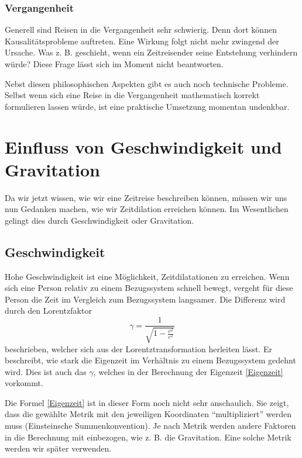 \begin{refsection}
\subsubsection{Vergangenheit}
Generell sind Reisen in die Vergangenheit sehr schwierig. Denn dort können Kausalitätsprobleme auftreten. Eine Wirkung folgt nicht mehr zwingend der Ursache. Was z. B. geschieht, wenn ein Zeitreisender seine Entstehung verhindern würde? Diese Frage lässt sich im Moment nicht beantworten. 

Nebst diesen philosophischen Aspekten gibt es auch noch technische Probleme. Selbst wenn sich eine Reise in die Vergangenheit mathematisch korrekt formulieren lassen würde, ist eine praktische Umsetzung momentan undenkbar.

\section{Einfluss von Geschwindigkeit und Gravitation}
Da wir jetzt wissen, wie wir eine Zeitreise beschreiben können, müssen wir uns nun Gedanken machen, wie wir Zeitdilation erreichen können. Im Wesentlichen gelingt dies durch Geschwindigkeit oder Gravitation. 
\subsection{Geschwindigkeit}
Hohe Geschwindigkeit ist eine Möglichkeit, Zeitdilatationen zu erreichen. Wenn sich eine Person relativ zu einem Bezugssystem schnell bewegt, vergeht für diese Person die Zeit im Vergleich zum Bezugssystem langsamer. Die Differenz wird durch den Lorentzfaktor 
%
%
%
\begin{equation} \label{lorentzfaktor}
\gamma=\frac{1}{\sqrt{1-\displaystyle\frac{v^2}{c^2}}} 
\end{equation}
beschrieben, welcher sich aus der Lorentztransformation herleiten lässt.
Er beschreibt, wie stark die Eigenzeit im Verhältnis zu einem Bezugssystem gedehnt wird. 
Dies ist auch das $\gamma$, welches in der Berechnung der Eigenzeit \eqref{Eigenzeit} vorkommt. 

Die Formel \eqref{Eigenzeit} ist in dieser Form noch nicht sehr anschaulich. Sie zeigt, dass die gewählte Metrik mit den jeweiligen Koordinaten ``multipliziert'' werden muss (Einsteinsche Summenkonvention). Je nach Metrik werden andere Faktoren in die Berechnung mit einbezogen, wie z. B. die Gravitation. Eine solche Metrik werden wir später verwenden.


\end{refsection}

